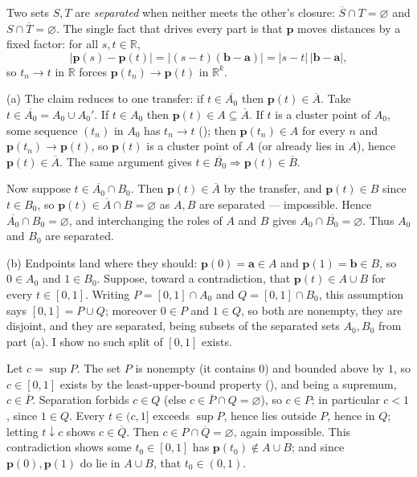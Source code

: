 \documentclass[main.tex]{subfiles}
\begin{document}
\begin{SolutionBlue}
Two sets $S,T$ are \emph{separated} when neither meets the other's closure: $\overline S\cap T=\varnothing$
and $S\cap\overline T=\varnothing$. The single fact that drives every part is that $\mathbf p$ moves
distances by a fixed factor: for all $s,t\in\mathbb R$,
\[
|\mathbf p(s)-\mathbf p(t)|=\bigl|(s-t)(\mathbf b-\mathbf a)\bigr|=|s-t|\,|\mathbf b-\mathbf a|,
\]
so $t_{n}\to t$ in $\mathbb R$ forces $\mathbf p(t_{n})\to\mathbf p(t)$ in $\mathbb R^{k}$.

(a) The claim reduces to one transfer: if $t\in\overline{A_{0}}$ then $\mathbf p(t)\in\overline A$. Take
$t\in\overline{A_{0}}=A_{0}\cup A_{0}'$. If $t\in A_{0}$ then $\mathbf p(t)\in A\subseteq\overline A$. If $t$
is a cluster point of $A_{0}$, some sequence $(t_{n})$ in $A_{0}$ has $t_{n}\to t$
(); then $\mathbf p(t_{n})\in A$ for every $n$
and $\mathbf p(t_{n})\to\mathbf p(t)$, so $\mathbf p(t)$ is a cluster point of $A$ (or already lies in $A$),
hence $\mathbf p(t)\in\overline A$. The same argument gives $t\in\overline{B_{0}}\Rightarrow\mathbf
p(t)\in\overline B$.

Now suppose $t\in\overline{A_{0}}\cap B_{0}$. Then $\mathbf p(t)\in\overline A$ by the transfer, and
$\mathbf p(t)\in B$ since $t\in B_{0}$, so $\mathbf p(t)\in\overline A\cap B=\varnothing$ as $A,B$ are
separated --- impossible. Hence $\overline{A_{0}}\cap B_{0}=\varnothing$, and interchanging the roles of
$A$ and $B$ gives $A_{0}\cap\overline{B_{0}}=\varnothing$. Thus $A_{0}$ and $B_{0}$ are separated.

(b) Endpoints land where they should: $\mathbf p(0)=\mathbf a\in A$ and $\mathbf p(1)=\mathbf b\in B$, so
$0\in A_{0}$ and $1\in B_{0}$. Suppose, toward a contradiction, that $\mathbf p(t)\in A\cup B$ for every
$t\in[0,1]$. Writing $P=[0,1]\cap A_{0}$ and $Q=[0,1]\cap B_{0}$, this assumption says $[0,1]=P\cup Q$;
moreover $0\in P$ and $1\in Q$, so both are nonempty, they are disjoint, and they are separated, being
subsets of the separated sets $A_{0},B_{0}$ from part (a). I show no such split of $[0,1]$ exists.

Let $c=\sup P$. The set $P$ is nonempty (it contains $0$) and bounded above by $1$, so $c\in[0,1]$ exists
by the least-upper-bound property (), and being a supremum, $c\in\overline P$.
Separation forbids $c\in Q$ (else $c\in\overline P\cap Q=\varnothing$), so $c\in P$; in particular $c<1$,
since $1\in Q$. Every $t\in(c,1]$ exceeds $\sup P$, hence lies outside $P$, hence in $Q$; letting $t\downarrow c$
shows $c\in\overline Q$. Then $c\in P\cap\overline Q=\varnothing$, again impossible. This contradiction shows
some $t_{0}\in[0,1]$ has $\mathbf p(t_{0})\notin A\cup B$; and since $\mathbf p(0),\mathbf p(1)$ do lie in
$A\cup B$, that $t_{0}\in(0,1)$.


\end{SolutionBlue}
\end{document}

